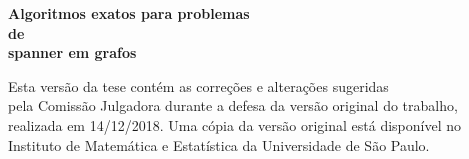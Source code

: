 \documentclass[12pt,twoside,a4paper]{book}
\newcommand{\titulo}{Algoritmos exatos para problemas de spanner em grafos}
\newcommand{\autor}{Hugo Vinicius Vaz Braga}
\begin{document}
%
%
%





%
%
%
%
 \newpage
 \thispagestyle{empty}
     \begin{center}
         \vspace*{2.3 cm}
	\textbf{\Large{Algoritmos exatos para problemas \\ \vspace{-0.3cm} de \\ spanner em grafos}}\\
         \vspace*{2 cm}
     \end{center}

     \vskip 2cm

     \begin{flushright}
 	Esta versão da tese contém as correções e alterações sugeridas\\
 	pela Comissão Julgadora durante a defesa da versão original do trabalho,\\
 	realizada em 14/12/2018. Uma cópia da versão original está disponível no\\
 	Instituto de Matemática e Estatística da Universidade de São Paulo.

     \vskip 2cm

     \end{flushright}
     \vskip 4.2cm
\end{document}
